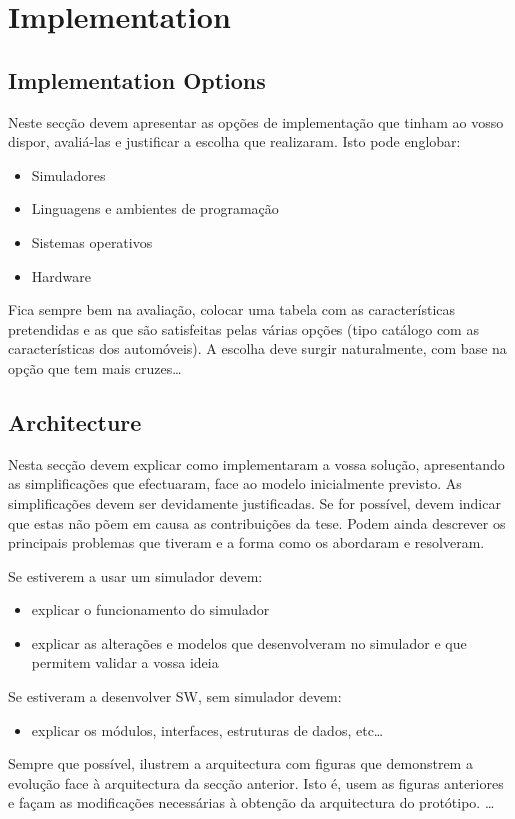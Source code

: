 \chapter{Implementation}
\label{chapter:implementation}

\section{Implementation Options}
Neste secção devem apresentar as opções de implementação que tinham ao vosso
dispor, avaliá-las e justificar a escolha que realizaram. Isto pode englobar:
\begin{itemize}
    \item Simuladores
    \item Linguagens e ambientes de programação
    \item Sistemas operativos
    \item Hardware
\end{itemize}
Fica sempre bem na avaliação, colocar uma tabela com as características
pretendidas e as que são satisfeitas pelas várias opções (tipo catálogo com as
características dos automóveis). A escolha deve surgir naturalmente, com base na
opção que tem mais cruzes\ldots

\section{Architecture}
Nesta secção devem explicar como implementaram a vossa solução, apresentando
as simplificações que efectuaram, face ao modelo inicialmente previsto. As
simplificações devem ser devidamente justificadas. Se for possível, devem indicar
que estas não põem em causa as contribuições da tese.
Podem ainda descrever os principais problemas que tiveram e a forma como os
abordaram e resolveram.

Se estiverem a usar um simulador devem:

\begin{itemize}
    \item explicar o funcionamento do simulador
    \item explicar as alterações e modelos que desenvolveram no simulador e que permitem validar a vossa ideia 
\end{itemize}

Se estiveram a desenvolver SW, sem simulador devem:
\begin{itemize}
    \item explicar os módulos, interfaces, estruturas de dados, etc\ldots
\end{itemize}

Sempre que possível, ilustrem a arquitectura com figuras que demonstrem a
evolução face à arquitectura da secção anterior. Isto é, usem as figuras anteriores
e façam as modificações necessárias à obtenção da arquitectura do protótipo.
\ldots
